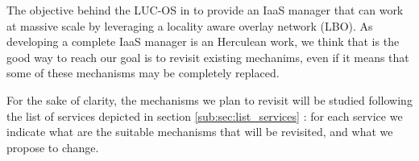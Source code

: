 



				





The objective behind the LUC-OS in to provide an IaaS manager that can work at 
massive scale by leveraging a locality aware overlay network (LBO). As 
developing a complete IaaS manager is an Herculean work, we think that is the
good way to reach our goal is to revisit existing mechanims, even if it means 
that some of these mechanisms may be completely replaced.

For the sake of clarity, the mechanisms we plan to revisit will be studied 
following the list of services depicted in section \ref{sub:sec:list_services} :
for each service we indicate what are the suitable mechanisms that will be 
revisited, and what we propose to change.

